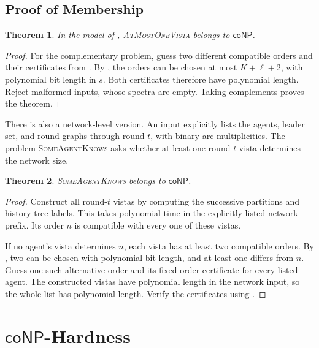 \documentclass[11pt]{article}
\newtheorem{theorem}{Theorem}
\begin{document}
\subsection{Proof of Membership}

\begin{theorem}
\label{thm:conp-vista-membership}
In the model of , \textnormal{\textsc{AtMostOneVista}}
belongs to \(\mathsf{coNP}\).
\end{theorem}

\begin{proof}
For the complementary problem, guess two different compatible
orders and their certificates from .
By , the orders can be chosen
at most \(K+\ell+2\), with polynomial bit length in \(s\).
Both certificates therefore have polynomial length.
Reject malformed inputs, whose spectra are empty.
Taking complements proves the theorem.
\end{proof}

There is also a network-level version.  An input explicitly lists
the agents, leader set, and round graphs through round \(t\), with
binary arc multiplicities. The problem
\textsc{SomeAgentKnows} asks whether at least one round-\(t\)
vista determines the network size.

\begin{theorem}
\label{thm:conp-network-membership}
\textnormal{\textsc{SomeAgentKnows}} belongs to \(\mathsf{coNP}\).
\end{theorem}

\begin{proof}
Construct all round-\(t\) vistas by computing the successive
partitions and history-tree labels.  This takes polynomial time
in the explicitly listed network prefix.  Its order \(n\) is
compatible with every one of these vistas.

If no agent's vista determines \(n\), each vista has at least
two compatible orders.  By , two
can be chosen with polynomial bit length, and at least one
differs from \(n\).  Guess one such alternative order and its
fixed-order certificate for every listed agent.
The constructed vistas have polynomial length in the network
input, so the whole list has polynomial length.
Verify the certificates using .
\end{proof}

\section{\texorpdfstring{\(\mathsf{coNP}\)}{coNP}-Hardness}
\label{app:conp-hardness}
\end{document}
